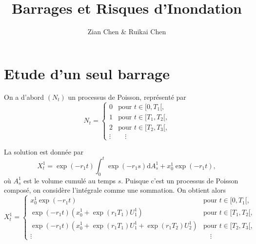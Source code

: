 \documentclass{article}
\title{Barrages et Risques d’Inondation}
\author{Zian Chen \& Ruikai Chen}
\def \dd {\mathrm{d}}
\begin{document}
\maketitle						%


\section{Etude d’un seul barrage}

On a d'abord $(N_t)$ un processus de Poisson, représenté par 
\[N_t = \begin{cases}0&\textrm{pour $t\in [0, T_1[$,}\\
  1&\textrm{pour $t\in [T_1, T_2[$,}\\
  2&\textrm{pour $t\in [T_2, T_3[$,}\\
  \vdots &\quad\vdots\end{cases}\]
  
La solution est donnée par
\[X_t^1 = \exp(-r_1 t)\int_0^t \exp(-r_1 s)\dd A_s^1 + x_0^1\exp(-r_1t),\]
où $A_s^1$ est le volume cumulé au temps $s$. Puisque c'est un processus de Poisson composé, on considère l'intégrale comme une sommation. On obtient alors
\[X_t^1 = \begin{cases}x_0^1\exp(-r_1 t)&\textrm{pour $t\in [0, T_1[$,}\\
  \exp(-r_1 t)(x_0^1+\exp(r_1 T_1)U_1^1)&\textrm{pour $t\in [T_1, T_2[$,}\\
  \exp(-r_1 t)(x_0^1+\exp(r_1 T_1)U_1^1+\exp(r_1 T_2)U_2^1)&\textrm{pour $t\in [T_2, T_3[$,}\\
  \vdots &\quad\vdots\end{cases}\]
\end{document}
